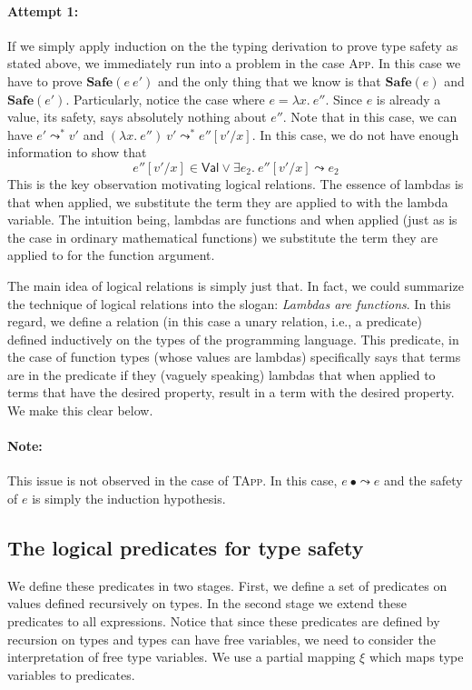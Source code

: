 \documentclass{article}
\newcommand{\VAL}{\mathsf{Val}}
\begin{document}
\paragraph{Attempt 1:}
If we simply apply induction on the the typing derivation to prove
type safety as stated above, we immediately run into a problem
in the case \textsc{App}. In this case we have to prove $\mathbf{Safe}(e~e')$ and the only thing that we know is that $\mathbf{Safe}(e)$ and $\mathbf{Safe}(e')$.
Particularly, notice the case where $e = \lambda x.~e''$.
Since $e$ is already a value, its safety, says absolutely nothing about $e''$.
Note that in this case, we can have $e' \leadsto^* v'$ and
$(\lambda x.~e'')~v' \leadsto^* e''[v'/x]$.
In this case, we do not have enough information to show that
\[
e''[v'/x] \in \VAL \lor \exists e_2.~e''[v'/x] \leadsto e_2
\]
This is the key observation motivating logical relations.
The essence of lambdas is that when applied, we substitute the
term they are applied to with the lambda variable.
The intuition being, lambdas are functions and when applied
(just as is the case in ordinary mathematical functions) we substitute the term they are applied to for the function argument.

The main idea of logical relations is simply just that.
In fact, we could summarize the technique of logical relations into
the slogan: \emph{Lambdas are functions}.
In this regard, we define a relation (in this case a unary relation, i.e., a predicate) defined inductively on the types of the programming language. This predicate, in the case of function types (whose values are lambdas) specifically says that terms
are in the predicate if they (vaguely speaking) lambdas that
when applied to terms that have the desired property, result in
a term with the desired property. We make this clear below.

\paragraph{Note:} This issue is not observed in the case of
\textsc{TApp}. In this case, $e~\bullet \leadsto e$ and the safety
of $e$ is simply the induction hypothesis. 

\subsection{The logical predicates for type safety}
We define these predicates in two stages. First, we define a
set of predicates on values defined recursively on types.
In the second stage we extend these predicates to all expressions.
Notice that since these predicates are defined by recursion on
types and types can have free variables, we need to consider
the interpretation of free type variables.
We use a partial mapping $\xi$ which maps type variables to
predicates.
\end{document}
